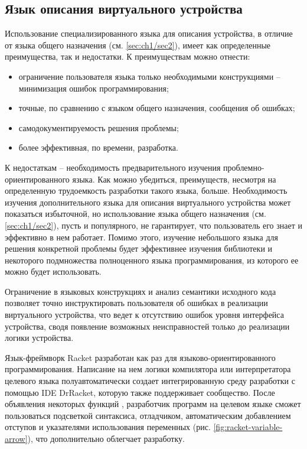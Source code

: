 \subsection{Язык описания виртуального устройства}\label{sec:ch2/sec1/sub1}

Использование специализированного языка для описания устройства, в отличие от языка общего назначения (см. \ref{sec:ch1/sec2}),
имеет как определенные преимущества, так и недостатки.
К преимуществам можно отнести:
\begin{itemize}
    \item ограничение пользователя языка только необходимыми конструкциями -- минимизация ошибок программирования;
    \item точные, по сравнению с языком общего назначения, сообщения об ошибках;
    \item самодокументируемость решения проблемы;
    \item более эффективная, по времени, разработка.
\end{itemize}

К недостаткам -- необходимость предварительного изучения проблемно-ориентированного языка.
Как можно убедиться, преимуществ, несмотря на определенную трудоемкость разработки такого языка,
больше.
Необходимость изучения дополнительного языка для описания виртуального устройства может показаться
избыточной, но использование языка общего назначения (см. \ref{sec:ch1/sec2}),
пусть и популярного, не гарантирует, что пользователь его знает и эффективно в нем работает.
Помимо этого, изучение небольшого языка для решения конкретной проблемы будет эффективнее
изучения библиотеки и некоторого подмножества полноценного языка программирования,
из которого ее можно будет использовать.

Ограничение в языковых конструкциях и анализ семантики исходного кода
позволяет точно инструктировать пользователя об ошибках в реализации виртуального устройства,
что ведет к отсутствию ошибок уровня интерфейса устройства,
сводя появление возможных неисправностей только до реализации логики устройства.

Язык-фреймворк Racket \cite{racket-lang} разработан как раз для языково-ориентированного
программирования. Написание на нем логики компилятора или интерпретатора целевого языка
полуавтоматически создает интегрированную среду разработки с помощью IDE DrRacket, которую
также поддерживает сообщество.
После объявления некоторых функций \cite{racket-drracket-integration}, разработчик программ
на целевом языке сможет пользоваться подсветкой синтаксиса, отладчиком, автоматическим добавлением
отступов и указателями использования переменных (рис. \ref{fig:racket-variable-arrow}), что дополнительно облегчает разработку.

